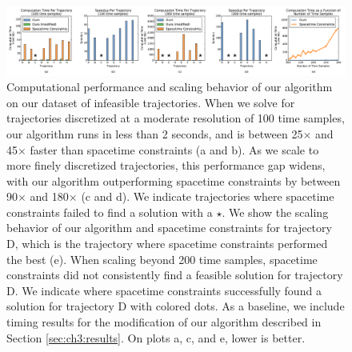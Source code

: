 \begin{figure}[t]
\centering
\includegraphics[width=6.0in]{images/2016_siggraph/00_computational_performance.pdf}
\caption{
Computational performance and scaling behavior of our algorithm on our dataset of infeasible trajectories.
When we solve for trajectories discretized at a moderate resolution of 100 time samples, our algorithm runs in less than 2 seconds, and is between 25$\times$ and 45$\times$ faster than spacetime constraints (a and b).
As we scale to more finely discretized trajectories, this performance gap widens, with our algorithm outperforming spacetime constraints by between 90$\times$ and 180$\times$ (c and d).
We indicate trajectories where spacetime constraints failed to find a solution with a $\star$.
We show the scaling behavior of our algorithm and spacetime constraints for trajectory \textsc{D}, which is the trajectory where spacetime constraints performed the best (e).
When scaling beyond 200 time samples, spacetime constraints did not consistently find a feasible solution for trajectory \textsc{D}.
We indicate where spacetime constraints successfully found a solution for trajectory \textsc{D} with colored dots.
As a baseline, we include timing results for the modification of our algorithm described in Section \ref{sec:ch3:results}.
On plots a, c, and e, lower is better.
}
\label{fig:ch3:computation}
\end{figure}

